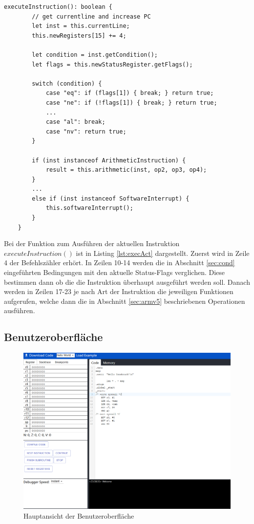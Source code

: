 \documentclass[a4paper, 11pt, onecolumn]{article}
\begin{document}
\begin{lstlisting}[style=JavaScript, basicstyle=\footnotesize, backgroundcolor=\color{backcolour}, caption={Funktion zum Ausführen der aktuellen Instruktion je nach Art der Instruktion}, captionpos=b, label={lst:execAct}]
executeInstruction(): boolean {
        // get currentline and increase PC
        let inst = this.currentLine;
        this.newRegisters[15] += 4;

        let condition = inst.getCondition();
        let flags = this.newStatusRegister.getFlags();

        switch (condition) {
            case "eq": if (flags[1]) { break; } return true;
            case "ne": if (!flags[1]) { break; } return true;
            ...
            case "al": break;
            case "nv": return true;
        }
        
        if (inst instanceof ArithmeticInstruction) {
        	result = this.arithmetic(inst, op2, op3, op4);
        }
        ...
        else if (inst instanceof SoftwareInterrupt) {
            this.softwareInterrupt();
        }
    }
\end{lstlisting}

Bei der Funktion zum Ausführen der aktuellen Instruktion $executeInstruction()$ ist in Listing \ref{lst:execAct} dargestellt. Zuerst wird in Zeile 4 der Befehlszähler erhört. In Zeilen 10-14 werden die in Abschnitt \ref{sec:cond} eingeführten Bedingungen mit den aktuelle Status-Flags verglichen. Diese bestimmen dann ob die die Instruktion überhaupt ausgeführt werden soll. Danach werden in Zeilen 17-23 je nach Art der Instruktion die jeweiligen Funktionen aufgerufen, welche dann die in Abschnitt \ref{sec:armv5} beschriebenen Operationen ausführen.

\subsection{Benutzeroberfläche}

\begin{figure}[!htb]
\centering
\includegraphics[width=1\textwidth]{data/ui}
\caption{Hauptansicht der Benutzeroberfläche}
\label{fig:ui}
\end{figure}
\end{document}
